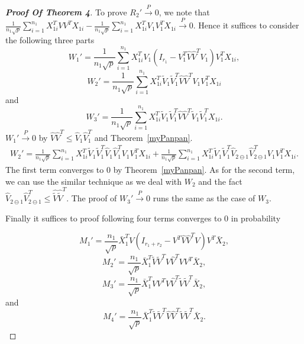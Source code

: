 \begin{proof}[\textbf{Proof Of Theorem 4}]
To prove $R_2'\xrightarrow{P}0$, we note that
 $\frac{1}{n_1\sqrt{p}}\sum_{i=1}^{n_1}X_{1i}^T VV^T X_{1i}-
\frac{1}{n_1\sqrt{p}}\sum_{i=1}^{n_1}X_{1i}^T V_1V_1^T X_{1i}\xrightarrow{P}0$.
    Hence it suffices to consider the following three parts
    \begin{equation*}
        W_1'=\frac{1}{n_1\sqrt{p}}\sum_{i=1}^{n_1}X_{1i}^T V_1(I_{r_1}-V_1^T\hat{V}\hat{V}^T V_1)V_1^T X_{1i},
    \end{equation*}
    \begin{equation*}
        W_2'=\frac{1}{n_1\sqrt{p}}\sum_{i=1}^{n_1}X_{1i}^T \tilde{V}_1\tilde{V}_1^T\hat{V}\hat{V}^T V_1V_1^T X_{1i}
    \end{equation*}
    and
    \begin{equation*}
        W_3'=\frac{1}{n_1\sqrt{p}}\sum_{i=1}^{n_1}X_{1i}^T \tilde{V}_1\tilde{V}_1^T\hat{V}\hat{V}^T \tilde{V}_1\tilde{V}_1^T X_{1i}.
    \end{equation*}
$W_1'\xrightarrow{P}0$ by $\hat{V}\hat{V}^T\leq \hat{V}_1\hat{V}_1^T$ and Theorem~\ref{myPanpan}.
\begin{equation*}
\begin{aligned}
        W_2'=\frac{1}{n_1\sqrt{p}}\sum_{i=1}^{n_1}X_{1i}^T \tilde{V}_1\tilde{V}_1^T\hat{V}_1\hat{V}_1^T V_1V_1^T X_{1i}+\frac{1}{n_1\sqrt{p}}\sum_{i=1}^{n_1}X_{1i}^T \tilde{V}_1\tilde{V}_1^T\hat{V}_{2\ominus 1}\hat{V}_{2\ominus 1}^T V_1V_1^T X_{1i}.
\end{aligned}
\end{equation*}
The first term converges to $0$ by Theorem~\ref{myPanpan}. As for the second term, we can use the similar technique as we deal with $W_2$ and the fact $\hat{V}_{2\ominus 1}\hat{V}_{2\ominus 1}^T\leq \hat{\tilde{V}}\hat{\tilde{V}}^T$.
The proof of $W_3'\xrightarrow{P}0$ runs the same as the case of $W_3$.

Finally it suffices to proof following four terms converges to $0$ in probability

    \begin{equation*}
        M_1'=\frac{n_1}{\sqrt{p}}\bar{X}_1^T V(I_{r_1+r_2}-V^T\hat{V}\hat{V}^T V)V^T \bar{X}_2,
    \end{equation*}
    \begin{equation*}
        M_2'=\frac{n_1}{\sqrt{p}}\bar{X}_1^T \tilde{V}\tilde{V}^T\hat{V}\hat{V}^T VV^T \bar{X}_2,
    \end{equation*}
    \begin{equation*}
        M_3'=\frac{n_1}{\sqrt{p}}\bar{X}_1^T {V}{V}^T\hat{V}\hat{V}^T \tilde{V}\tilde{V}^T \bar{X}_2,
    \end{equation*}
    and
    \begin{equation*}
        M_4'=\frac{n_1}{\sqrt{p}}\bar{X}_1^T \tilde{V}\tilde{V}^T\hat{V}\hat{V}^T \tilde{V}\tilde{V}^T \bar{X}_2.
    \end{equation*}


\end{proof}
